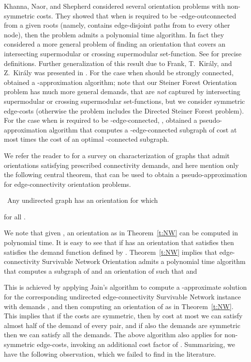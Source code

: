 \documentclass[envcountsame]{llncs}
\begin{document}
Khanna, Naor, and Shepherd \cite{KNS} considered several orientation problems with non-symmetric costs.
They showed that when  is required to be -edge-outconnected from a given roots 
(namely,  contains  edge-disjoint paths from  to every other node),
then the problem admits a polynomial time algorithm.
In fact they considered a more general problem of finding an orientation that covers 
an intersecting supermodular or crossing supermodular set-function.
See \cite{KNS} for precise definitions. Further generalization of this result due to 
Frank, T.~Kir\'{a}ly, and Z.~Kir\'{a}ly was presented in \cite{FKK}.
For the case when  should be strongly connected, \cite{KNS} obtained 
a -approximation algorithm; note that our {\sf Steiner Forest Orientation} problem 
has much more general demands, that are {\em not} captured by  
intersecting supermodular or crossing supermodular set-functions, but we 
consider symmetric edge-costs (otherwise the problem includes the {\sf Directed Steiner Forest} problem). 
For the case when  is required to be 
-edge-connected, , \cite{KNS} obtained a pseudo-approximation algorithm 
that computes a -edge-connected subgraph of cost at most  times the cost 
of an optimal -connected subgraph.

We refer the reader to \cite{FK} for a survey on characterization of graphs that admit orientations satisfying 
prescribed connectivity demands, and here mention only 
the following central theorem,
that can be used to obtain a pseudo-approximation for edge-connectivity orientation problems.

\begin{theorem}  \label{t:NW} \ 
Any undirected graph  has an orientation  for which

for all . 
\end{theorem}

We note that given , an orientation as in Theorem~\ref{t:NW} can be computed in polynomial time.
It is easy to see that if  has 
an orientation  that satisfies  then  satisfies the demand function  defined by 
.
Theorem~\ref{t:NW} implies that edge-connectivity {\sf Survivable Network Orientation} admits 
a polynomial time algorithm that computes a subgraph  of  and an orientation  of 
such that  and  

This is achieved by applying Jain's \cite{Jain} algorithm to compute a 
-approximate solution  for the corresponding undirected 
edge-connectivity {\sf Survivable Network} instance with demands ,
and then computing an orientation  of  as in Theorem~\ref{t:NW}.
This implies that if the costs are symmetric, then by cost at most 
we can satisfy almost half of the demand of every pair, 
and if also the demands are symmetric then we can satisfy all the demands.
The above algorithm also applies for non-symmetric edge-costs, 
invoking an additional cost factor of .
Summarizing, we have the following observation, which we failed to find in the literature. 
\end{document}
